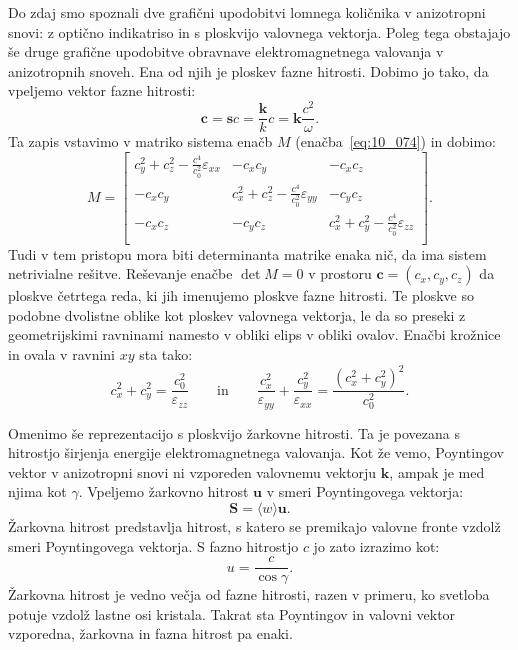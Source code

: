 \begin{remark}
Do zdaj smo spoznali dve grafični upodobitvi lomnega količnika v anizotropni snovi: 
z optično indikatriso in s ploskvijo valovnega vektorja. Poleg tega obstajajo še
druge grafične upodobitve obravnave elektromagnetnega valovanja v anizotropnih snoveh.
Ena od njih je ploskev fazne hitrosti. Dobimo jo tako, da vpeljemo vektor 
fazne hitrosti:
\begin{equation}
\mathbf{c} = \mathbf{s}c = \frac{\mathbf{k}}{k}c = \mathbf{k}\frac{c^2}{\omega}.
\label{eq:10_094}
\end{equation}
Ta zapis vstavimo v matriko sistema enačb $M$ (enačba~\ref{eq:10_074}) in dobimo:
\begin{equation}
M=
\left[\begin{array}{ccc}
c_y^2 +
c_z^2- \frac{c^4}{c_0^2}\varepsilon_{xx} &  
- c_x c_y
& - c_x c_z\\
- c_x c_y & 
c_x^2 + c_z^2- 
\frac{c^4}{c_0^2}\varepsilon_{yy} &
- c_y c_z\\
- c_x c_z& 
- c_y c_z& 
c_x^2 +c_y^2 - 
\frac{c^4}{c_0^2}\varepsilon_{zz}\\
\end{array}\right]\!\!.
\label{eq:10_095}
\end{equation}
Tudi v tem pristopu mora biti determinanta matrike enaka nič, da ima sistem netrivialne rešitve.
Reševanje enačbe $\det M = 0$ v prostoru $\mathbf{c} = (c_x, c_y, c_z)$ da ploskve četrtega reda, ki 
jih imenujemo ploskve fazne hitrosti. Te ploskve so podobne dvolistne oblike kot ploskev valovnega
vektorja, le da so preseki z geometrijskimi ravninami namesto v obliki elips v obliki
ovalov. Enačbi krožnice in ovala v ravnini $xy$ sta tako:
\begin{equation}
c_x^2+c_y^2 = \frac{c_0^2}{\varepsilon_{zz}}\qquad \mathrm{in}\qquad 
\frac{c_x^2}{\varepsilon_{yy}} +\frac{c_y^2}{\varepsilon_{xx}} = 
\frac{(c_x^2+c_y^2)^2}{c_0^2}.
\label{eq:10_096}
\end{equation}

Omenimo še reprezentacijo s ploskvijo žarkovne hitrosti. Ta je povezana s 
hitrostjo
širjenja energije elektromagnetnega valovanja. Kot že vemo, Poyntingov vektor
v anizotropni snovi ni vzporeden valovnemu vektorju $\mathbf{k}$, ampak je med njima kot $\gamma$. 
Vpeljemo žarkovno hitrost $\mathbf{u}$ v smeri Poyntingovega vektorja:
\begin{equation}
\mathbf{S} = \langle w \rangle \mathbf{u}.
\label{eq:10_097}
\end{equation}
Žarkovna hitrost predstavlja hitrost, s katero se premikajo valovne fronte vzdolž smeri
Poyntingovega vektorja. S fazno hitrostjo $c$ jo zato izrazimo kot:
\begin{equation}
u = \frac{c}{\cos \gamma}.
\label{eq:10_098}
\end{equation}
Žarkovna hitrost je vedno večja od fazne hitrosti, razen v primeru, ko svetloba
potuje vzdolž lastne osi kristala. Takrat sta Poyntingov in valovni vektor vzporedna, žarkovna
in fazna hitrost pa enaki.


\end{remark}
